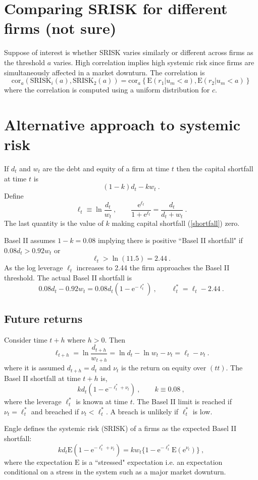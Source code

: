 \documentclass[authoryear]{elsarticle}
\newcommand{\E}{\mathrm{E}}
\newcommand{\e}{\mathrm{e}}
\newcommand{\cor}{\mathrm{cor}}
\newcommand{\eref}[1]{(\ref{#1})}
\newcommand{\cq}{\ , \qquad}
\newcommand{\be}[1]{\begin{equation}\label{#1}}
\newcommand{\ee}{\end{equation}}
\begin{document}
\section{Comparing SRISK for different firms (not sure)}

Suppose of interest is whether SRISK varies similarly or different across firms as the threshold $a$ varies. High correlation implies high systemic risk since firms are simultaneously affected in a market downturn. The correlation is
$$
\cor_a\left( \mathrm{SRISK}_i(a), \mathrm{SRISK}_2(a)\right) = \cor_a \left\{\E(r_1|u_m < a),\E(r_2|u_m < a)   \right\}
$$
where the correlation is computed using a uniform distribution for $c$. 


\section{Alternative approach to systemic risk}

If $d_t$ and $w_t$ are the debt and equity of a firm at time $t$ then the capital shortfall at time $t$ is 
\be{shortfall}
(1-k) d_t  - k w_t\ .
\ee
Define 
$$
\ell_t \equiv \ln\frac{d_t}{w_t} \cq \frac{\e^{\ell_t}}{1+\e^{\ell_t}} = \frac{d_t}{d_t+w_t}\ .
$$ 
The last quantity is the value of $k$ making capital shortfall \eref{shortfall} zero.

Basel II assumes $1-k=0.08$ implying there is  positive  ``Basel II shortfall"  if
$
 0.08 d_t>0.92 w_t
$
or  
$$
\ell_t > \ln(11.5) = 2.44\ .
$$
As the log leverage $\ell_t$  increases to 2.44 the firm approaches the Basel II threshold. 
The actual Basel II shortfall is
$$
 0.08 d_t - 0.92 w_t =0.08d_t(1-\e^{-\ell^*_t})\cq \ell_t^*=\ell_t-2.44 \ .
$$

\subsection{Future returns}

Consider  time  $t+h$ where $h>0$.  Then
$$
\ell_{t+h} = \ln \frac{d_{t+h}}{w_{t+h}} = \ln d_t - \ln w_t - \nu_{t} = \ell_t -\nu_{t} \ .
$$
where it is assumed $d_{t+h}=d_t$ and $\nu_{t}$ is the return on equity over $(tt)$. 
The  Basel II shortfall  at time $t+h$ is,
\be{bs}
kd_t(1-\e^{-\ell^*_t+\nu_{t}})\cq k\equiv 0.08\ , 
\ee
where the leverage $\ell^*_t$ is known at time $t$.  
The Basel II limit is reached if $\nu_{t}=\ell_t^*$ and  breached  if
$
\nu_{t}< \ell_t^*
$.
A breach is  unlikely if $\ell^*_t$ is low.


Engle defines the systemic risk (SRISK) of a firms as the expected Basel II shortfall:
$$
k d_t\E(1-\e^{-\ell^*_t+\nu_t}) =  kw_t\{1-\e^{-\ell^*_t}\E(\e^{\nu_t})\}\ ,
$$
where the expectation $\E$ is a ``stressed" expectation i.e. an expectation conditional on a stress in the system such as a major market downturn.
\end{document}
